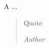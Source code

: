 \null\vspace{2cm}

\begin{flushright}
A ...
\end{flushright}

\vfill

\begin{quote}
    Quote

    \textit{Author}
\end{quote}

\vfill\null
